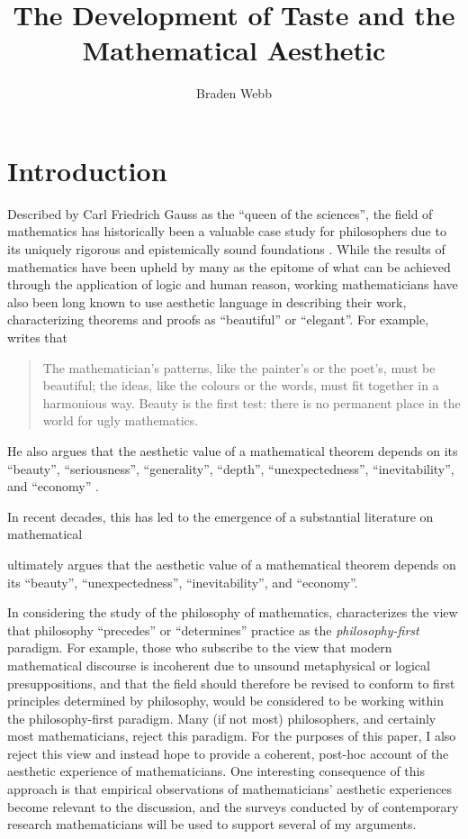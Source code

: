 \documentclass[a4paper,man,natbib]{apa6}
\title{The Development of Taste and the Mathematical Aesthetic}
\author{Braden Webb}
\affiliation{Department of Philosophy, Brigham Young University\\
PHIL 495R: Directed Readings in the Philosophy of Mathematics\\
Dr. Derek Haderlie\\
22 April 2023}
\begin{document}
\maketitle

\section{Introduction}
Described by Carl Friedrich Gauss as the ``queen of the sciences'', the field of mathematics has 
historically been a valuable case study for philosophers due to its uniquely rigorous and epistemically sound
foundations \citep{shapiro_thinking_2000}. While the results of mathematics have been upheld by many as the 
epitome of what can be achieved through the application of logic and human reason, working mathematicians have 
also been long known to use aesthetic language in describing their work, characterizing theorems and proofs as
``beautiful'' or ``elegant''. For example, \cite{hardy_mathematicians_1992} writes that
\begin{quotation}
      The mathematician’s patterns, like the painter’s or the poet’s, must be beautiful; the ideas, like the 
      colours or the words, must fit together in a harmonious way. Beauty is the first test: there is no 
      permanent place in the world for ugly mathematics.
\end{quotation}
He also argues that the aesthetic value of a mathematical theorem depends on its ``beauty'', ``seriousness'', 
``generality'', ``depth'', ``unexpectedness'', ``inevitability'', and ``economy'' \cite{hardy_mathematicians_1992}.

In recent decades, this has led to the emergence of a substantial literature on mathematical

\cite{hardy_mathematicians_1992} ultimately argues that the aesthetic value of a mathematical theorem depends on its
``beauty'', ``unexpectedness'', ``inevitability'', and ``economy''.


In considering the study of the philosophy of mathematics, \cite{shapiro_thinking_2000} characterizes
the view that philosophy ``precedes'' or ``determines'' practice as the \textit{philosophy-first} paradigm.
For example, those who subscribe to the view that modern mathematical discourse is incoherent due to unsound
metaphysical or logical presuppositions, and that the field should therefore be revised to conform to
first principles determined by philosophy, would be considered to be working within the philosophy-first
paradigm. Many (if not most) philosophers, and certainly most mathematicians, reject this paradigm. For the
purposes of this paper, I also reject this view and instead hope to provide a coherent, post-hoc account
of the aesthetic experience of mathematicians. One interesting consequence of this approach is that empirical
observations of mathematicians' aesthetic experiences become relevant to the discussion, and the surveys
conducted by \cite{inglis_beauty_2015} of contemporary research mathematicians will be used to support several
of my arguments. 
\end{document}
